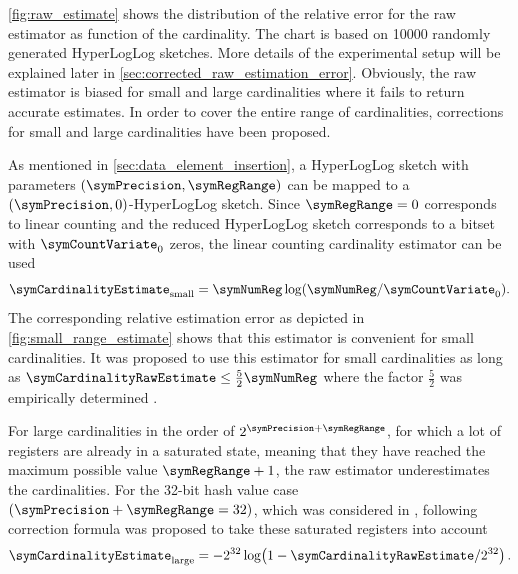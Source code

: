 \documentclass[a4paper]{scrartcl}
\begin{document}
\cref{fig:raw_estimate} shows the distribution of the relative error for the raw estimator as function of the cardinality. The chart is based on \num{10000} randomly generated HyperLogLog sketches. More details of the experimental setup will be explained later in \cref{sec:corrected_raw_estimation_error}. Obviously, the raw estimator is biased for small and large cardinalities where it fails to return accurate estimates. In order to cover the entire range of cardinalities, corrections for small and large cardinalities have been proposed.

As mentioned in \cref{sec:data_element_insertion}, a HyperLogLog sketch with parameters $(\symPrecision, \symRegRange)$ can be mapped to a $(\symPrecision, 0)$-HyperLogLog sketch. Since $\symRegRange=0$ corresponds to linear counting and the reduced HyperLogLog sketch corresponds to a bitset with $\symCountVariate_0$ zeros, the linear counting cardinality estimator \cite{Whang1990} can be used
\begin{equation}
\label{equ:linear_counting_estimator}
\symCardinalityEstimate_\text{small} = \symNumReg \log(\symNumReg/\symCountVariate_0).
\end{equation}
The corresponding relative estimation error as depicted in \cref{fig:small_range_estimate} shows that this estimator is convenient for small cardinalities. It was proposed to use this estimator for small cardinalities as long as $\symCardinalityRawEstimate \leq \frac{5}{2}\symNumReg$ where the factor $\frac{5}{2}$ was empirically determined \cite{Flajolet2007}. 

For large cardinalities in the order of $2^{\symPrecision+\symRegRange}$, for which a lot of registers are already in a saturated state, meaning that they have reached the maximum possible value $\symRegRange + 1$, the raw estimator underestimates the cardinalities. For the 32-bit hash value case $(\symPrecision+\symRegRange=32)$, which was considered in \cite{Flajolet2007}, following correction formula was proposed to take these saturated registers into account
\begin{equation}
\label{equ:large_range_estimate}
\symCardinalityEstimate_\text{large}
=
-2^{32}\log\!\left(1-\symCardinalityRawEstimate/2^{32}\right).
\end{equation}
\end{document}
